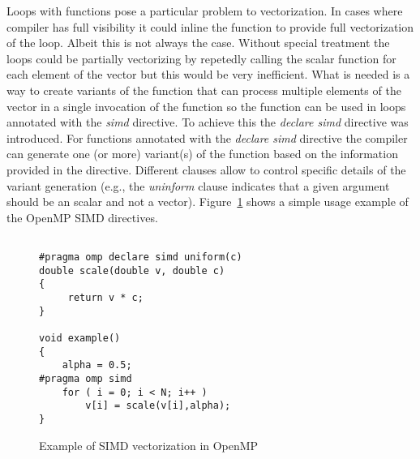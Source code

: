 Loops with functions pose a particular problem to vectorization. In cases where compiler has full visibility it could inline the function to provide full vectorization of the loop. Albeit this is not always the case. Without special treatment the loops could be partially vectorizing by repetedly calling the scalar function for each element of the vector but this would be very inefficient. What is needed is a way to create variants of the function that can process multiple elements of the vector in a single invocation of the function so the function can be used in loops annotated with the \emph{simd} directive. To achieve this the \emph{declare simd} directive was introduced. For functions annotated with the \emph{declare simd} directive the compiler can generate one (or more) variant(s) of the function based on the information provided in the directive. Different clauses allow to control specific details of the variant generation (e.g., the \emph{uninform} clause indicates that a given argument should be an scalar and not a vector). Figure~\ref{fig:simd-example} shows a simple usage example of the OpenMP SIMD directives.

\begin{figure}
\begin{lstlisting}

#pragma omp declare simd uniform(c)
double scale(double v, double c)
{
     return v * c;
}

void example()
{
    alpha = 0.5;
#pragma omp simd 
    for ( i = 0; i < N; i++ )
        v[i] = scale(v[i],alpha);
}

\end{lstlisting}
\caption{Example of SIMD vectorization in OpenMP}
\label{fig:simd-example}
\end{figure}

